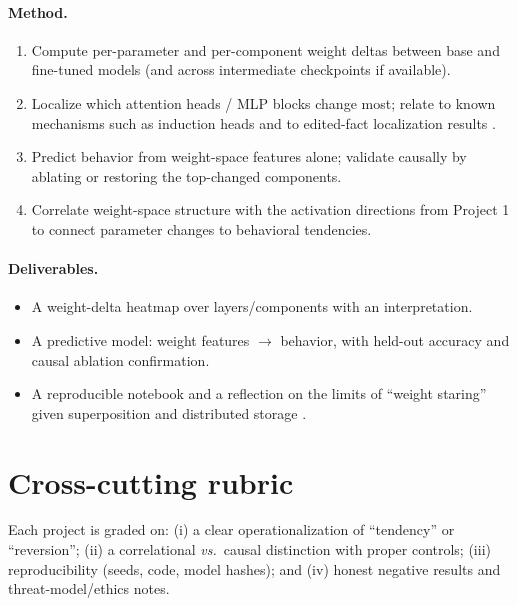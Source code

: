 \documentclass[11pt]{article}
\begin{document}
\paragraph{Method.}
\begin{enumerate}[leftmargin=1.5em]
  \item Compute per-parameter and per-component weight deltas between base and
  fine-tuned models (and across intermediate checkpoints if available).
  \item Localize which attention heads / MLP blocks change most; relate to known
  mechanisms such as induction heads \citep{olsson2022context} and to
  edited-fact localization results \citep{meng2022locating}.
  \item Predict behavior from weight-space features alone; validate causally by
  ablating or restoring the top-changed components.
  \item Correlate weight-space structure with the activation directions from
  Project 1 to connect parameter changes to behavioral tendencies.
\end{enumerate}

\paragraph{Deliverables.}
\begin{itemize}[leftmargin=1.5em]
  \item A weight-delta heatmap over layers/components with an interpretation.
  \item A predictive model: weight features $\rightarrow$ behavior, with
  held-out accuracy and causal ablation confirmation.
  \item A reproducible notebook and a reflection on the limits of
  ``weight staring'' given superposition and distributed storage
  \citep{elhage2022superposition,elhage2021mathematical}.
\end{itemize}

\section*{Cross-cutting rubric}
Each project is graded on: (i) a clear operationalization of ``tendency'' or
``reversion''; (ii) a correlational \emph{vs.}\ causal distinction with proper
controls; (iii) reproducibility (seeds, code, model hashes); and (iv) honest
negative results and threat-model/ethics notes.
\end{document}
